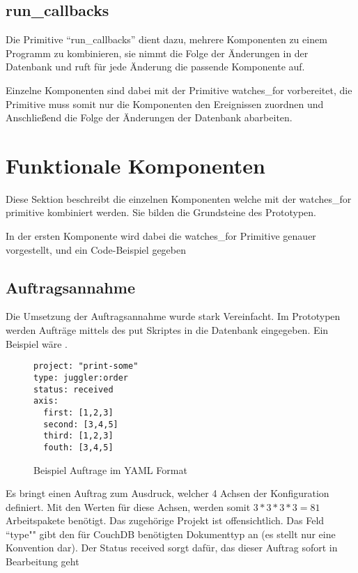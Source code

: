 \subsection{run\_callbacks}

Die Primitive ``run\_callbacks'' dient dazu, mehrere Komponenten zu einem Programm
zu kombinieren, sie nimmt die Folge der Änderungen in der Datenbank und
ruft für jede Änderung die passende Komponente auf.

Einzelne Komponenten sind dabei mit der Primitive watches\_for vorbereitet,
die Primitive muss somit nur die Komponenten den Ereignissen zuordnen
und Anschließend die Folge der Änderungen der Datenbank abarbeiten.

\section{Funktionale Komponenten}

Diese Sektion beschreibt die einzelnen Komponenten welche mit der watches\_for primitive kombiniert werden. Sie bilden die Grundsteine des Prototypen.

In der ersten Komponente wird dabei die watches\_for Primitive genauer vorgestellt, und ein Code-Beispiel gegeben

\subsection{Auftragsannahme}

Die Umsetzung der Auftragsannahme wurde stark Vereinfacht.
Im Prototypen werden Aufträge mittels des put Skriptes in die Datenbank eingegeben.
Ein Beispiel wäre .
\begin{figure}
\begin{verbatim}
project: "print-some"
type: juggler:order
status: received
axis:
  first: [1,2,3]
  second: [3,4,5]
  third: [1,2,3]
  fouth: [3,4,5]
\end{verbatim}
\caption{Beispiel Auftrage im YAML Format}
\label{fig:auftrag-beispieldaten}
\end{figure}

Es bringt einen Auftrag zum Ausdruck, welcher 4 Achsen der Konfiguration definiert.
Mit den Werten für diese Achsen, werden somit $3*3*3*3 = 81$ Arbeitspakete benötigt.
Das zugehörige Projekt ist offensichtlich. Das Feld ``type"" gibt den für CouchDB benötigten Dokumenttyp an (es stellt nur eine Konvention dar).
Der Status received sorgt dafür, das dieser Auftrag sofort in Bearbeitung geht

